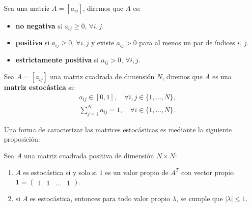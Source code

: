 \begin{definition}
    Sea una matriz $A=[a_{ij}]$, diremos que $A$ es:
    \begin{itemize}
        \item \textbf{no negativa} si $a_{ij}\geq 0,\, \forall i,j$.
        \item \textbf{positiva} si $a_{ij}\geq 0,\, \forall i,j$ y existe $a_{ij}>0$ para al menos un par de índices $i,\,j$.
        \item \textbf{estrictamente positiva} si $a_{ij}> 0,\, \forall i,j$.
    \end{itemize}
\end{definition}

\begin{definition}
    Sea $A=[a_{ij}]$ una matriz cuadrada de dimensión $N$, diremos que $A$ es una \textbf{matriz estocástica} si:
    \[
    \begin{aligned}
    a_{ij}\in[0,1],\quad \forall i,j \in \{1,...,N\},\\
    \sum_{j=1}^N a_{ij}=1, \quad \forall i\in\{1,...,N\}.
    \end{aligned}
    \]
\end{definition}

Una forma de caracterizar las matrices estocásticas es mediante la siguiente proposición:

\begin{proposition}\label{propiedadMatrizEstocástica}
Sea $A$ una matriz cuadrada positiva de dimensión $N\times N$:
\begin{enumerate}
    \item $A$ es estocástica si y solo si $1$ es un valor propio de $A^T$ con vector propio $\mathbf{1}=\begin{pmatrix}1 & 1 & \dots & 1\end{pmatrix}$.
    \item si $A$ es estocástica, entonces para todo valor propio $\lambda$, se cumple que  $\left|\lambda\right|\leq1.$
\end{enumerate}
\end{proposition}

